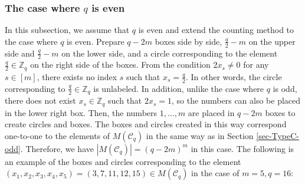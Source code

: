 \documentclass{article}
\theoremstyle{plain}
\theoremstyle{definition}
\theoremstyle{remark}
\numberwithin{equation}{section}
\newcommand{\Cc}{\mathcal{C}}
\begin{document}
\subsubsection{The case where $q$ is even}\label{sec-TypeC-even}
In this subsection, we assume that $q$ is even and extend the counting method to the case where $q$ is even.
Prepare $q-2m$ boxes side by side, $\displaystyle \frac{q}{2}-m$ on the upper side and $\displaystyle \frac{q}{2}-m$ on the lower side, and a circle corresponding to the element $\displaystyle \frac{q}{2}\in\mathbb{Z}_q$ on the right side of the boxes.
From the condition $2x_s\neq 0$ for any $s\in [m]$, there exists no index $s$ such that $\displaystyle x_s=\frac{q}{2}$.
In other words, the circle corresponding to $\displaystyle \frac{q}{2}\in\mathbb{Z}_q$ is unlabeled.
In addition, unlike the case where $q$ is odd, there does not exist $x_s\in\mathbb{Z}_q$ such that $2x_s=1$, so the numbers can also be placed in the lower right box.
Then, the numbers $1,\dots,m$ are placed in $q-2m$ boxes to create circles and boxes.
The boxes and circles created in this way correspond one-to-one to the elements of $M(\Cc_q)$ in the same way as in Section \ref{sec-TypeC-odd}.
Therefore, we have $|M(\Cc_q)|=(q-2m)^m$ in this case.
The following is an example of the boxes and circles corresponding to the element $(x_1,x_2,x_3,x_4,x_5)=(3,7,11,12,15)\in M(\Cc_q)$ in the case of $m = 5, q = 16$:
\end{document}
